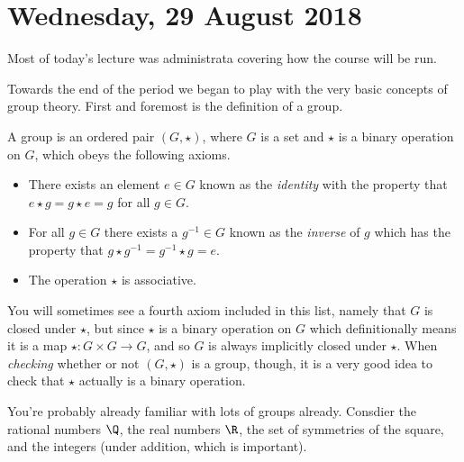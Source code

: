 \section{Wednesday, 29 August 2018}

Most of today's lecture was administrata covering how the course will be run.

Towards the end of the period we began to play with the very basic concepts of group theory. First and foremost is the definition of a group.

\begin{definition}[Group]
A group is an ordered pair $(G, \star)$, where $G$ is a set and $\star$ is a binary operation on $G$, which obeys the following axioms.
\begin{itemize}
\item There exists an element $e \in G$ known as the \emph{identity} with the property that $e \star g = g \star e = g$ for all $g \in G$.
\item For all $g \in G$ there exists a $g^{-1} \in G$ known as the \emph{inverse} of $g$ which has the property that $g \star g^{-1}= g^{-1} \star g = e$.
\item The operation $\star$ is associative.
\end{itemize}
\end{definition}

You will sometimes see a fourth axiom included in this list, namely that $G$ is closed under $\star$, but since $\star$ is a binary operation on $G$ which definitionally means it is a map $\star : G \times G \to G$, and so $G$ is always implicitly closed under $\star$. When \emph{checking} whether or not $(G, \star)$ is a group, though, it is a very good idea to check that $\star$ actually is a binary operation.

You're probably already familiar with lots of groups already. Consdier the rational numbers $\Q$, the real numbers $\R$, the set of symmetries of the square, and the integers (under addition, which is important).